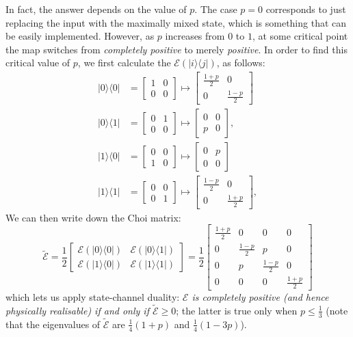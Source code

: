 \documentclass[fleqn]{article}
\begin{document}
In fact, the answer depends on the value of \(p\).
The case \(p=0\) corresponds to just replacing the input with the maximally mixed state, which is something that can be easily implemented.
However, as \(p\) increases from \(0\) to \(1\), at some critical point the map switches from \emph{completely positive} to merely \emph{positive}.
In order to find this critical value of \(p\), we first calculate the \(\mathcal{E} (|i\rangle\langle j|)\), as follows:
\[
  \begin{aligned}
    |0\rangle\langle 0|
    &= \begin{bmatrix}1&0\\0&0\end{bmatrix}
    \longmapsto
    \begin{bmatrix}\frac{1+p}{2}&0\\0&\frac{1-p}{2}\end{bmatrix}
  \\|0\rangle\langle 1|
    &= \begin{bmatrix}0&1\\0&0\end{bmatrix}
    \longmapsto
    \begin{bmatrix}0&0\\p&0\end{bmatrix},
  \\|1\rangle\langle 0|
    &= \begin{bmatrix}0&0\\1&0\end{bmatrix}
    \longmapsto
    \begin{bmatrix}0&p\\0&0\end{bmatrix}
  \\|1\rangle\langle 1|
    &= \begin{bmatrix}0&0\\0&1\end{bmatrix}
    \longmapsto
    \begin{bmatrix}\frac{1-p}{2}&0\\0&\frac{1+p}{2}\end{bmatrix},
  \end{aligned}
\]
We can then write down the Choi matrix:
\[
  \widetilde{\mathcal{E}}
  = \frac12
  \begin{bmatrix}
    \mathcal{E}(|0\rangle\langle 0|)
    & \mathcal{E}(|0\rangle\langle 1|)
  \\\mathcal{E}(|1\rangle\langle 0|)
    & \mathcal{E}(|1\rangle\langle 1|)
  \end{bmatrix}
  = \frac{1}{2}
  \left[
    \begin{array}{cc|cc}
    \frac{1+p}{2} & 0 & 0 & 0
  \\0 & \frac{1-p}{2} & p & 0
  \\\hline
    0 & p & \frac{1-p}{2} & 0
  \\0 & 0 & 0 & \frac{1+p}{2}
   \end{array}
  \right]
\]
which lets us apply state-channel duality: \emph{\(\mathcal{E}\) is completely positive (and hence physically realisable) if and only if \(\widetilde{\mathcal{E}}\geqslant 0\)};
the latter is true only when \(p\leqslant\frac13\) (note that the eigenvalues of \(\widetilde{\mathcal{E}}\) are \(\frac{1}{4}(1+p)\) and \(\frac{1}{4}(1-3p)\)).
\end{document}

